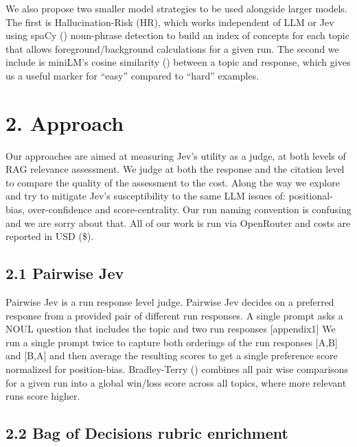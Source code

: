 \documentclass[
  10pt,
]{article}
\begin{document}
We also propose two smaller model strategies to be used alongside larger
models. The first is Hallucination-Risk (HR), which works independent of
LLM or Jev using spaCy () noun-phrase detection to build an index of concepts for
each topic that allows foreground/background calculations for a given
run. The second we include is miniLM's cosine similarity
() between a topic and
response, which gives us a useful marker for ``easy'' compared to
``hard'' examples.

\section{2. Approach}\label{approach}

Our approaches are aimed at measuring Jev's utility as a judge, at both
levels of RAG relevance assessment. We judge at both the response and
the citation level to compare the quality of the assessment to the cost.
Along the way we explore and try to mitigate Jev's susceptibility to the
same LLM issues of: positional-bias, over-confidence and
score-centrality. Our run naming convention is confusing and we are
sorry about that. All of our work is run via OpenRouter and costs are
reported in USD (\$).

\subsection{2.1 Pairwise Jev}\label{pairwise-jev}

Pairwise Jev is a run response level judge. Pairwise Jev decides on a
preferred response from a provided pair of different run responses. A
single prompt asks a NOUL question that includes the topic and two run
responses {[}appendix1{]} We run a single prompt twice to capture both
orderings of the run responses {[}A,B{]} and {[}B,A{]} and then average
the resulting scores to get a single preference score normalized for
position-bias. Bradley-Terry () combines all pair wise comparisons for a given run into a
global win/loss score across all topics, where more relevant runs score
higher.

\subsection{2.2 Bag of Decisions rubric
enrichment}\label{bag-of-decisions-rubric-enrichment}
\end{document}
